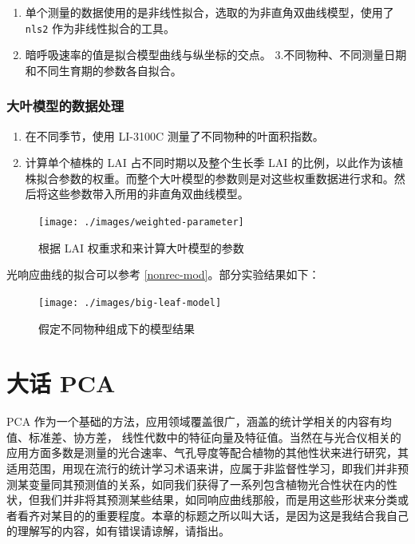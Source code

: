 \documentclass[
]{krantz}
\providecommand{\tightlist}{%
  \setlength{\itemsep}{0pt}\setlength{\parskip}{0pt}}
\begin{document}
\begin{enumerate}
\def\labelenumi{\arabic{enumi}.}
\tightlist
\item
  单个测量的数据使用的是非线性拟合，选取的为非直角双曲线模型，使用了 \texttt{nls2} 作为非线性拟合的工具。
\item
  暗呼吸速率的值是拟合模型曲线与纵坐标的交点。
  3.不同物种、不同测量日期和不同生育期的参数各自拟合。
\end{enumerate}

\hypertarget{big-leaf-data-MODEL}{%
\subsection{大叶模型的数据处理}\label{big-leaf-data-MODEL}}

\begin{enumerate}
\def\labelenumi{\arabic{enumi}.}
\tightlist
\item
  在不同季节，使用 LI-3100C 测量了不同物种的叶面积指数。
\item
  计算单个植株的 LAI 占不同时期以及整个生长季 LAI 的比例，以此作为该植株拟合参数的权重。而整个大叶模型的参数则是对这些权重数据进行求和。然后将这些参数带入所用的非直角双曲线模型。
\end{enumerate}

\begin{figure}

{\centering \texttt{[image: ./images/weighted-parameter]} 

}

\caption{根据 LAI 权重求和来计算大叶模型的参数}\label{fig:lai-big-leaf}
\end{figure}

光响应曲线的拟合可以参考 \ref{nonrec-mod}。部分实验结果如下：

\begin{figure}

{\centering \texttt{[image: ./images/big-leaf-model]} 

}

\caption{假定不同物种组成下的模型结果}\label{fig:lai-big-leaf-model}
\end{figure}

\hypertarget{pca-anylysis}{%
\chapter{大话 PCA}\label{pca-anylysis}}

PCA 作为一个基础的方法，应用领域覆盖很广，涵盖的统计学相关的内容有均值、标准差、协方差， 线性代数中的特征向量及特征值。当然在与光合仪相关的应用方面多数是测量的光合速率、气孔导度等配合植物的其他性状来进行研究，其适用范围，用现在流行的统计学习术语来讲，应属于非监督性学习，即我们并非预测某变量同其预测值的关系，如同我们获得了一系列包含植物光合性状在内的性状，但我们并非将其预测某些结果，如同响应曲线那般，而是用这些形状来分类或者看齐对某目的的重要程度。本章的标题之所以叫大话，是因为这是我结合我自己的理解写的内容，如有错误请谅解，请指出。
\end{document}
